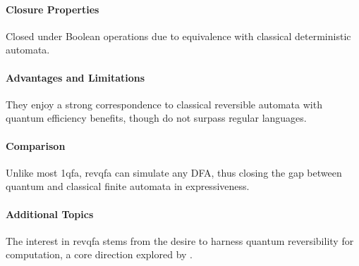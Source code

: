 \paragraph{Closure Properties}
Closed under Boolean operations due to equivalence with classical deterministic automata.

\paragraph{Advantages and Limitations}
They enjoy a strong correspondence to classical reversible automata with quantum efficiency benefits, though do not surpass regular languages.

\paragraph{Comparison}
Unlike most \gls{1qfa}, \gls{revqfa} can simulate any DFA, thus closing the gap between quantum and classical finite automata in expressiveness.

\paragraph{Additional Topics}
The interest in \gls{revqfa} stems from the desire to harness quantum reversibility for computation, a core direction explored by \cite{ciamarra2001quantum}.
